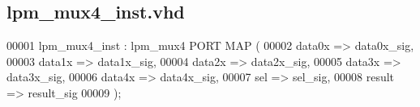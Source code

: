 \subsection{lpm\+\_\+mux4\+\_\+inst.\+vhd}
\label{lpm__mux4__inst_8vhd_source}

\begin{DoxyCode}
00001 lpm\_mux4\_inst : lpm_mux4 \textcolor{keywordflow}{PORT} \textcolor{keywordflow}{MAP} (
00002         data0x   => data0x\_sig,
00003         data1x   => data1x\_sig,
00004         data2x   => data2x\_sig,
00005         data3x   => data3x\_sig,
00006         data4x   => data4x\_sig,
00007         sel  => sel\_sig,
00008         result   => result\_sig
00009     \textcolor{vhdlchar}{)};
\end{DoxyCode}
